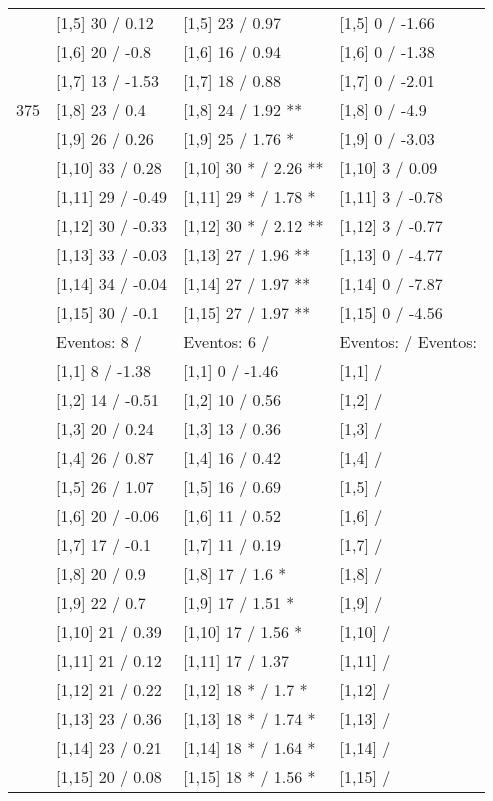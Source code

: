 \begin{table}
\begin{tabular}[t]{llll}
 & {}[1,5] 30  / 0.12 & {}[1,5] 23  / 0.97 & {}[1,5] 0  / -1.66\\
 & {}[1,6] 20  / -0.8 & {}[1,6] 16  / 0.94 & {}[1,6] 0  / -1.38\\
 & {}[1,7] 13  / -1.53 & {}[1,7] 18  / 0.88 & {}[1,7] 0  / -2.01\\
375 & {}[1,8] 23  / 0.4 & {}[1,8] 24  / 1.92 ** & {}[1,8] 0  / -4.9\\
\addlinespace
 & {}[1,9] 26  / 0.26 & {}[1,9] 25  / 1.76 * & {}[1,9] 0  / -3.03\\
 & {}[1,10] 33  / 0.28 & {}[1,10] 30 * / 2.26 ** & {}[1,10] 3  / 0.09\\
 & {}[1,11] 29  / -0.49 & {}[1,11] 29 * / 1.78 * & {}[1,11] 3  / -0.78\\
 & {}[1,12] 30  / -0.33 & {}[1,12] 30 * / 2.12 ** & {}[1,12] 3  / -0.77\\
 & {}[1,13] 33  / -0.03 & {}[1,13] 27  / 1.96 ** & {}[1,13] 0  / -4.77\\
\addlinespace
 & {}[1,14] 34  / -0.04 & {}[1,14] 27  / 1.97 ** & {}[1,14] 0  / -7.87\\
 & {}[1,15] 30  / -0.1 & {}[1,15] 27  / 1.97 ** & {}[1,15] 0  / -4.56\\
 & Eventos:  8 / & Eventos:  6 / & Eventos:   / Eventos:\\
 & {}[1,1] 8  / -1.38 & {}[1,1] 0  / -1.46 & {}[1,1]  /\\
 & {}[1,2] 14  / -0.51 & {}[1,2] 10  / 0.56 & {}[1,2]  /\\
\addlinespace
 & {}[1,3] 20  / 0.24 & {}[1,3] 13  / 0.36 & {}[1,3]  /\\
 & {}[1,4] 26  / 0.87 & {}[1,4] 16  / 0.42 & {}[1,4]  /\\
 & {}[1,5] 26  / 1.07 & {}[1,5] 16  / 0.69 & {}[1,5]  /\\
 & {}[1,6] 20  / -0.06 & {}[1,6] 11  / 0.52 & {}[1,6]  /\\
 & {}[1,7] 17  / -0.1 & {}[1,7] 11  / 0.19 & {}[1,7]  /\\
\addlinespace
500 & {}[1,8] 20  / 0.9 & {}[1,8] 17  / 1.6 * & {}[1,8]  /\\
 & {}[1,9] 22  / 0.7 & {}[1,9] 17  / 1.51 * & {}[1,9]  /\\
 & {}[1,10] 21  / 0.39 & {}[1,10] 17  / 1.56 * & {}[1,10]  /\\
 & {}[1,11] 21  / 0.12 & {}[1,11] 17  / 1.37 & {}[1,11]  /\\
 & {}[1,12] 21  / 0.22 & {}[1,12] 18 * / 1.7 * & {}[1,12]  /\\
\addlinespace
 & {}[1,13] 23  / 0.36 & {}[1,13] 18 * / 1.74 * & {}[1,13]  /\\
 & {}[1,14] 23  / 0.21 & {}[1,14] 18 * / 1.64 * & {}[1,14]  /\\
 & {}[1,15] 20  / 0.08 & {}[1,15] 18 * / 1.56 * & {}[1,15]  /\\
\bottomrule
\end{tabular}
\end{table}
